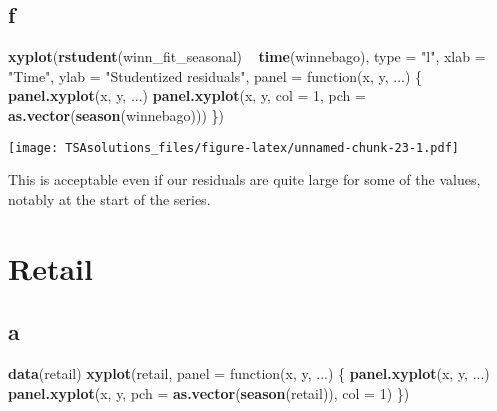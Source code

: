 \documentclass[]{book}
\newenvironment{Shaded}{\begin{snugshade}}{\end{snugshade}}
\newcommand{\KeywordTok}[1]{\textcolor[rgb]{0.13,0.29,0.53}{\textbf{{#1}}}}
\newcommand{\DataTypeTok}[1]{\textcolor[rgb]{0.13,0.29,0.53}{{#1}}}
\newcommand{\DecValTok}[1]{\textcolor[rgb]{0.00,0.00,0.81}{{#1}}}
\newcommand{\StringTok}[1]{\textcolor[rgb]{0.31,0.60,0.02}{{#1}}}
\newcommand{\NormalTok}[1]{{#1}}
\theoremstyle{definition}
\theoremstyle{definition}
\theoremstyle{remark}
\begin{document}
\subsection*{f}\label{f-1}

\begin{Shaded}
\begin{Highlighting}[]
\KeywordTok{xyplot}\NormalTok{(}\KeywordTok{rstudent}\NormalTok{(winn_fit_seasonal) ~}\StringTok{ }\KeywordTok{time}\NormalTok{(winnebago), }\DataTypeTok{type =} \StringTok{"l"}\NormalTok{,}
       \DataTypeTok{xlab =} \StringTok{"Time"}\NormalTok{, }\DataTypeTok{ylab =} \StringTok{"Studentized residuals"}\NormalTok{,}
       \DataTypeTok{panel =} \NormalTok{function(x, y, ...) \{}
         \KeywordTok{panel.xyplot}\NormalTok{(x, y, ...)}
         \KeywordTok{panel.xyplot}\NormalTok{(x, y, }\DataTypeTok{col =} \DecValTok{1}\NormalTok{, }\DataTypeTok{pch =} \KeywordTok{as.vector}\NormalTok{(}\KeywordTok{season}\NormalTok{(winnebago)))}
       \NormalTok{\})}
\end{Highlighting}
\end{Shaded}

\texttt{[image: TSAsolutions\_files/figure-latex/unnamed-chunk-23-1.pdf]}

This is acceptable even if our residuals are quite large for some of the
values, notably at the start of the series.

\section{Retail}\label{retail}

\subsection*{a}\label{a-25}

\begin{Shaded}
\begin{Highlighting}[]
\KeywordTok{data}\NormalTok{(retail)}
\KeywordTok{xyplot}\NormalTok{(retail, }\DataTypeTok{panel =} \NormalTok{function(x, y, ...) \{}
  \KeywordTok{panel.xyplot}\NormalTok{(x, y, ...)}
  \KeywordTok{panel.xyplot}\NormalTok{(x, y, }\DataTypeTok{pch =} \KeywordTok{as.vector}\NormalTok{(}\KeywordTok{season}\NormalTok{(retail)), }\DataTypeTok{col =} \DecValTok{1}\NormalTok{)}
\NormalTok{\})}
\end{Highlighting}
\end{Shaded}
\end{document}
